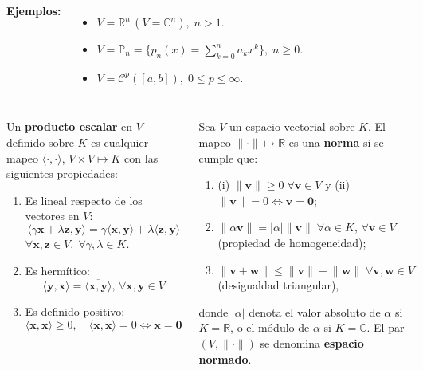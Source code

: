 \documentclass[9pt, aspectratio=169]{beamer}
\begin{document}
\begin{frame}
\begin{columns}[t]
  \textbf{Ejemplos:}
  \begin{itemize}
      \item $V = \mathbb{R}^n \, (V = \mathbb{C}^n), \; n > 1$.
      \item $V = \mathbb{P}_n = \{ p_n(x) = \sum_{k=0}^n a_k x^k \}, \; n \geq 0$.
      \item $V = \mathcal{C}^p([a, b]), \; 0 \leq p \leq \infty$.
  \end{itemize}
  \end{columns}
  \end{frame}

\begin{frame}
\begin{columns}[t]
\cx
\begin{definition}
  Un \textbf{producto escalar} en $V$ definido sobre $K$ es cualquier mapeo $\langle \cdot, \cdot \rangle$, $V \times V \mapsto K$ con las siguientes propiedades:
\begin{enumerate}
  \item Es lineal respecto de los vectores en $V$:
      \[ \langle \gamma \bm{x} + \lambda \bm{z}, \bm{y} \rangle = \gamma \langle \bm{x}, \bm{y} \rangle + \lambda \langle \bm{z}, \bm{y} \rangle \]
      $\forall \bm{x}, \bm{z} \in V, \; \forall \gamma, \lambda \in K$.
  \item Es hermítico:
      \[ \langle \bm{y},\bm{x} \rangle = \overline{ \langle \bm{x}, \bm{y} \rangle }, \, \forall \bm{x}, \bm{y} \in V \]
  \item Es definido positivo:
      \[ \langle \bm{x}, \bm{x} \rangle \geq 0, \quad \langle \bm{x}, \bm{x} \rangle = 0 \Leftrightarrow \bm{x} = \bm{0} \]
\end{enumerate}
\end{definition} \pause


\cx
\begin{definition}
  Sea $V$ un espacio vectorial sobre $K$. El mapeo $\lVert \cdot \rVert \mapsto \mathbb{R}$ es una \textbf{norma} si se cumple que:
  \begin{enumerate}
      \item (i) $\lVert \bm{v} \rVert \geq 0 \; \forall \bm{v} \in V$ y (ii) $\lVert \bm{v} \rVert = 0 \Leftrightarrow \bm{v} = \bm{0}$;
      \item $\lVert \alpha \bm{v} \rVert = |\alpha| \lVert \bm{v} \rVert \; \forall \alpha \in K , \, \forall \bm{v} \in V$ (propiedad de homogeneidad);
      \item $\lVert \bm{v} + \bm{w} \rVert \leq \lVert \bm{v} \rVert + \lVert \bm{w} \rVert \; \forall \bm{v}, \bm{w} \in V$ (desigualdad triangular),
  \end{enumerate}
  donde $|\alpha|$ denota el valor absoluto de $\alpha$ si $K = \mathbb{R}$, o el módulo de $\alpha$ si $K = \mathbb{C}$. El par $(V, \lVert \cdot \rVert)$ se denomina \textbf{espacio normado}.
\end{definition}
\end{columns}
\end{frame}
\end{document}

